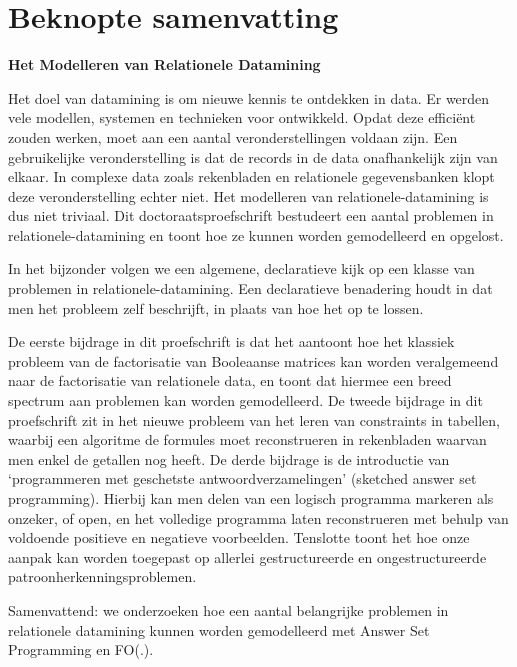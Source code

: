 \chapter*{Beknopte samenvatting}
\textbf{Het Modelleren van Relationele Datamining}


Het doel van datamining is om nieuwe kennis te ontdekken in data.
Er werden vele modellen, systemen en technieken voor ontwikkeld.
Opdat deze effici\"ent zouden werken, moet aan een aantal veronderstellingen voldaan zijn.  Een gebruikelijke veronderstelling is dat de records in de data onafhankelijk zijn van elkaar.
In complexe data zoals rekenbladen en relationele gegevensbanken klopt deze veronderstelling echter niet. Het modelleren van relationele-datamining is dus niet triviaal. Dit doctoraatsproefschrift bestudeert een aantal problemen in relationele-datamining en toont hoe ze kunnen worden gemodelleerd en opgelost.

In het bijzonder volgen we een algemene, declaratieve kijk op een klasse van problemen in relationele-datamining. Een declaratieve benadering houdt in dat men het probleem zelf beschrijft, in plaats van hoe het op te lossen. 

De eerste bijdrage in dit proefschrift is dat het aantoont hoe het klassiek probleem van de factorisatie van Booleaanse matrices kan worden veralgemeend naar de factorisatie van relationele data, en toont dat hiermee een breed spectrum aan problemen kan worden gemodelleerd.
De tweede bijdrage in dit proefschrift zit in het nieuwe probleem van het leren van constraints in tabellen, waarbij een algoritme de formules moet reconstrueren in rekenbladen waarvan men enkel de getallen nog heeft.
De derde bijdrage is de introductie van `programmeren met geschetste
antwoordverzamelingen' (sketched answer set programming). Hierbij kan men delen van een logisch programma markeren als onzeker, of open, en het volledige programma laten reconstrueren met behulp van voldoende positieve en negatieve voorbeelden.  Tenslotte toont het hoe onze aanpak kan worden toegepast op allerlei gestructureerde en ongestructureerde patroonherkenningsproblemen.

Samenvattend: we onderzoeken hoe een aantal belangrijke problemen in
relationele datamining kunnen worden gemodelleerd met Answer Set
Programming en FO(.).


\cleardoublepage

